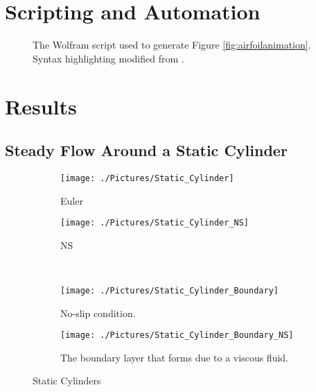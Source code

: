 \documentclass[10pt, titlepage]{article}
\begin{document}
\section{Scripting and Automation}
\lipsum[1-2]

\begin{figure}[p]

\caption[Automated Wolfram Script]{The Wolfram script used to generate Figure \ref{fig:airfoilanimation}. Syntax highlighting modified from \cite{syntax}.}
\label{script}
\end{figure}

\section{Results}
\lipsum[1-2]

\subsection{Steady Flow Around a Static Cylinder}
\lipsum[1-2]

\begin{figure}[htbp]
\begin{subfigure}{0.5\linewidth}
  \centering
  \texttt{[image: ./Pictures/Static\_Cylinder]}
  \caption{Euler}
  \label{fig:staticeuler}
\end{subfigure}
\begin{subfigure}{0.5\linewidth}
  \centering
  \texttt{[image: ./Pictures/Static\_Cylinder\_NS]}
  \caption{NS}
  \label{fig:staticNS}
\end{subfigure} \\
\begin{subfigure}{0.5\linewidth}
 \centering
 \texttt{[image: ./Pictures/Static\_Cylinder\_Boundary]}
 \caption{No-slip condition.}
 \label{fig:eulerboundary}
\end{subfigure}
\begin{subfigure}{0.5\linewidth}
 \centering
 \texttt{[image: ./Pictures/Static\_Cylinder\_Boundary\_NS]}
 \caption{The boundary layer that forms due to a viscous fluid.}
 \label{fig:nsboundary}
\end{subfigure}
\caption[Static Cylinder]{Static Cylinders}
\label{fig:static}
\end{figure}

\end{document}
